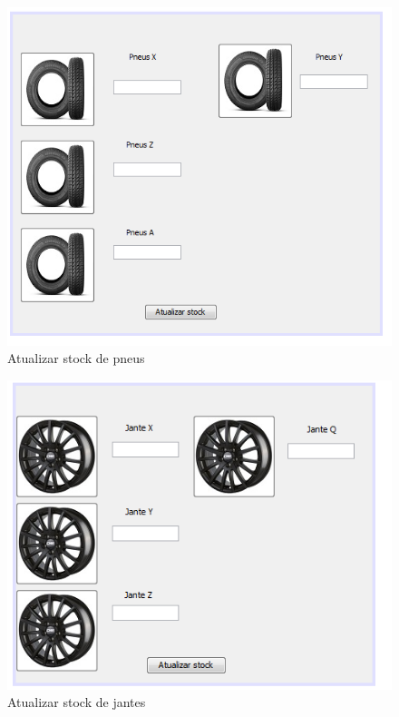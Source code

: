 \begin{figure}
    \centering
    \includegraphics[width=\textwidth]{analise_de_requisitos/img/atualizar_stock_pneus.png}
    \caption{Atualizar stock de pneus}
\end{figure}

\begin{figure}
    \centering
    \includegraphics[width=\textwidth]{analise_de_requisitos/img/atualizar_stock_jantes.png}
    \caption{Atualizar stock de jantes}
\end{figure}

